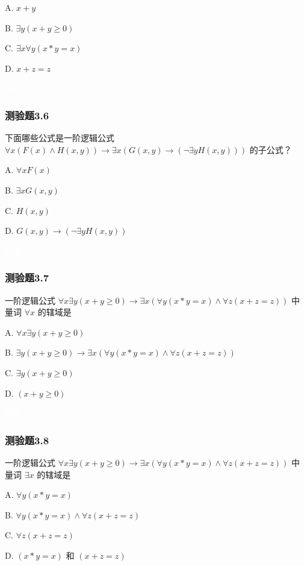 \documentclass[UTF8, heading=true]{ctexart}
\begin{document}
A. $
x+y
$


B. $
\exists y(x+y \geq 0)
$


C. $
\exists x \forall y(x * y=x)
$


D. $
x+z=z
$

\textcolor{white}{答案：BD}

\subsubsection{测验题3.6}

下面哪些公式是一阶逻辑公式 $\forall x(F(x) \wedge H(x, y)) \rightarrow \exists x(G(x, y) \rightarrow(\neg \exists y H(x, y)))$ 的子公式？

A. $
\forall x F(x)
$


B. $
\exists x G(x, y)
$

C. $
H(x, y)
$

D. $
G(x, y) \rightarrow(\neg \exists y H(x, y))
$

\textcolor{white}{答案：CD}




\subsubsection{测验题3.7}

一阶逻辑公式 $\forall x \exists y(x+y \geq 0) \rightarrow \exists x(\forall y(x * y=x) \wedge \forall z(x+z=z))$ 中量词 $\forall x$ 的辖域是 $\qquad$

A. $\forall x \exists y(x+y \geq 0)$

B. $ \exists y(x+y \geq 0) \rightarrow \exists x(\forall y(x * y=x) \wedge \forall z(x+z=z))$

C. $\exists y(x+y \geq 0)$

D. $(x+y \geq 0)$

\textcolor{white}{答案：C}

\subsubsection{测验题3.8}

一阶逻辑公式 $\forall x \exists y(x+y \geq 0) \rightarrow \exists x(\forall y(x * y=x) \wedge \forall z(x+z=z))$ 中量词 $\exists x$ 的辖域是 $\qquad$

A. $ \forall y(x * y=x)$

B. $\forall y(x * y=x) \wedge \forall z(x+z=z)$

C. $\forall z(x+z=z)$

D. $(x * y=x)$ 和 $(x+z=z)$
\end{document}
